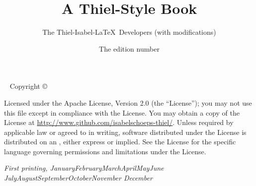 \documentclass[nohyper,nobib]{thiel-book}
\title{A Thiel-Style Book}
\date{The edition number}
\author[The Tufte-LaTeX Developers (with modifications)]{The Thiel-Isabel-LaTeX\ Developers (with modifications)}
\newcommand{\monthyear}{%
  \ifcase\month\or January\or February\or March\or April\or May\or June\or
  July\or August\or September\or October\or November\or
  December\fi\space\number\year
}
\newcommand{\openepigraph}[2]{%
  \begin{fullwidth}
  \sffamily\large
  \begin{doublespace}
  \noindent\allcaps{#1}\\%
  \noindent\allcaps{#2}%
  \end{doublespace}
  \end{fullwidth}
}
\newcommand{\blankpage}{\newpage\hbox{}\thispagestyle{empty}\newpage}
\begin{document}
\frontmatter




\maketitle


\newpage
\begin{fullwidth}
~\vfill
\thispagestyle{empty}
\setlength{\parindent}{0pt}
\setlength{\parskip}{\baselineskip}
Copyright \copyright\ \the\year\ \thanklessauthor

\par{}

\par{}

\par Licensed under the Apache License, Version 2.0 (the ``License''); you may not
use this file except in compliance with the License. You may obtain a copy
of the License at \url{http://www.github.com/isabelschoeps-thiel/}. Unless
required by applicable law or agreed to in writing, software distributed
under the License is distributed on an , either express or implied. See the
License for the specific language governing permissions and limitations
under the License.

\par\textit{First printing, \monthyear}
\end{fullwidth}
\end{document}
